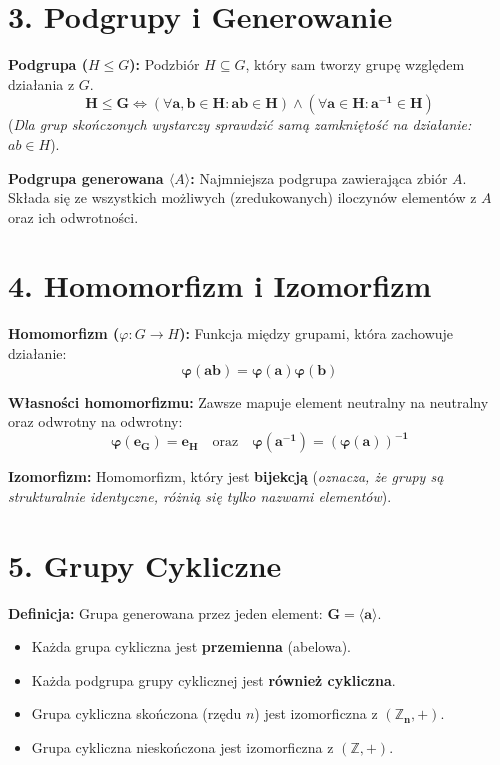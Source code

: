 \documentclass[12pt,a4paper]{article}
\begin{document}
\section*{3. Podgrupy i Generowanie}
\noindent\textbf{Podgrupa ($H \le G$):} Podzbiór $H \subseteq G$, który sam tworzy grupę względem działania z $G$. %
$$ \mathbf{H \le G \iff (\forall a,b \in H: ab \in H) \land (\forall a \in H: a^{-1} \in H)} $$ %
(\textit{Dla grup skończonych wystarczy sprawdzić samą zamkniętość na działanie: $ab \in H$}). %

\noindent\textbf{Podgrupa generowana $\langle A \rangle$:} Najmniejsza podgrupa zawierająca zbiór $A$. Składa się ze wszystkich możliwych (zredukowanych) iloczynów elementów z $A$ oraz ich odwrotności. %

\section*{4. Homomorfizm i Izomorfizm}
\noindent\textbf{Homomorfizm ($\varphi: G \to H$):} Funkcja między grupami, która zachowuje działanie: %
$$ \mathbf{\varphi(ab) = \varphi(a)\varphi(b)} $$ %

\noindent\textbf{Własności homomorfizmu:} Zawsze mapuje element neutralny na neutralny oraz odwrotny na odwrotny: %
$$ \mathbf{\varphi(e_G) = e_H} \quad \text{oraz} \quad \mathbf{\varphi(a^{-1}) = (\varphi(a))^{-1}} $$ %

\noindent\textbf{Izomorfizm:} Homomorfizm, który jest \textbf{bijekcją} (\textit{oznacza, że grupy są strukturalnie identyczne, różnią się tylko nazwami elementów}). %

\section*{5. Grupy Cykliczne}
\noindent\textbf{Definicja:} Grupa generowana przez jeden element: $\mathbf{G = \langle a \rangle}$. %
\begin{itemize}
    \item Każda grupa cykliczna jest \textbf{przemienna} (abelowa). %
    \item Każda podgrupa grupy cyklicznej jest \textbf{również cykliczna}. %
    \item Grupa cykliczna skończona (rzędu $n$) jest izomorficzna z $\mathbf{(\mathbb{Z}_n, +)}$. %
    \item Grupa cykliczna nieskończona jest izomorficzna z $\mathbf{(\mathbb{Z}, +)}$. %
\end{itemize}
\end{document}
